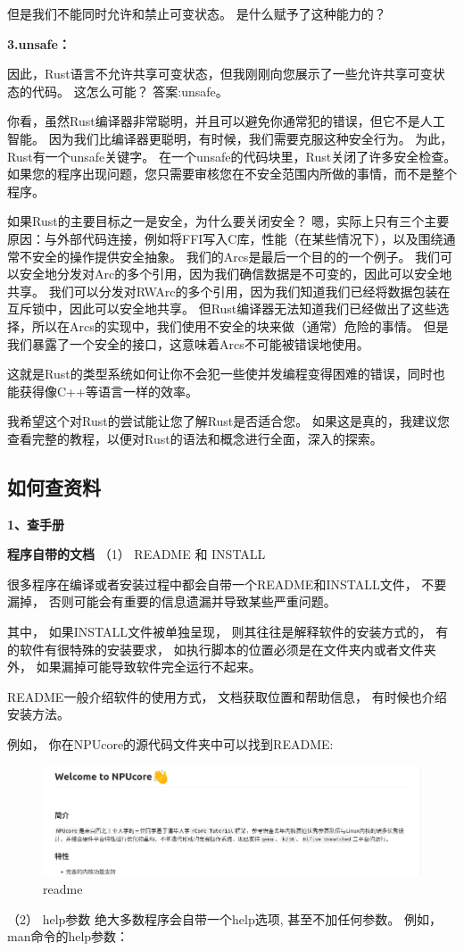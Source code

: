 但是我们不能同时允许和禁止可变状态。 是什么赋予了这种能力的？

\textbf{3.unsafe：}

因此，Rust语言不允许共享可变状态，但我刚刚向您展示了一些允许共享可变状态的代码。 这怎么可能？ 答案:unsafe。

你看，虽然Rust编译器非常聪明，并且可以避免你通常犯的错误，但它不是人工智能。 因为我们比编译器更聪明，有时候，我们需要克服这种安全行为。 为此，Rust有一个unsafe关键字。 在一个unsafe的代码块里，Rust关闭了许多安全检查。 如果您的程序出现问题，您只需要审核您在不安全范围内所做的事情，而不是整个程序。

如果Rust的主要目标之一是安全，为什么要关闭安全？
嗯，实际上只有三个主要原因：与外部代码连接，例如将FFI写入C库，性能（在某些情况下），以及围绕通常不安全的操作提供安全抽象。 我们的Arcs是最后一个目的的一个例子。 我们可以安全地分发对Arc的多个引用，因为我们确信数据是不可变的，因此可以安全地共享。 我们可以分发对RWArc的多个引用，因为我们知道我们已经将数据包装在互斥锁中，因此可以安全地共享。 但Rust编译器无法知道我们已经做出了这些选择，所以在Arcs的实现中，我们使用不安全的块来做（通常）危险的事情。 但是我们暴露了一个安全的接口，这意味着Arcs不可能被错误地使用。

这就是Rust的类型系统如何让你不会犯一些使并发编程变得困难的错误，同时也能获得像C++等语言一样的效率。

我希望这个对Rust的尝试能让您了解Rust是否适合您。 如果这是真的，我建议您查看完整的教程，以便对Rust的语法和概念进行全面，深入的探索。
\subsection{如何查资料}
\textbf{1、查手册}

\textbf{程序自带的文档}
（1） README 和 INSTALL

很多程序在编译或者安装过程中都会自带一个README和INSTALL文件， 不要漏掉， 否则可能会有重要的信息遗漏并导致某些严重问题。

其中， 如果INSTALL文件被单独呈现， 则其往往是解释软件的安装方式的， 有的软件有很特殊的安装要求， 如执行脚本的位置必须是在文件夹内或者文件夹外， 如果漏掉可能导致软件完全运行不起来。

README一般介绍软件的使用方式， 文档获取位置和帮助信息， 有时候也介绍安装方法。

例如， 你在NPUcore的源代码文件夹中可以找到README:
\begin{figure}[htb]
	\centering
	\includegraphics[width=\textwidth]{figures/02-01-readme.png}
	\caption{
		readme
	}
	\label{fig:readme}
\end{figure}
（2） help参数
绝大多数程序会自带一个help选项, 甚至不加任何参数。 例如， man命令的help参数：

